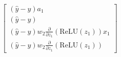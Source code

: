 \documentclass[preview]{standalone}
\begin{document}
\begin{align*}
\begin{bmatrix}(\hat{y} - y) a_1 \\ (\hat{y} - y) \\(\hat{y} - y) w_2 \frac{\partial}{\partial z_1}(\text{ReLU}(z_1)) x_1 \\ (\hat{y} - y) w_2 \frac{\partial}{\partial z_1}(\text{ReLU}(z_1)) \end{bmatrix}
\end{align*}
\end{document}
